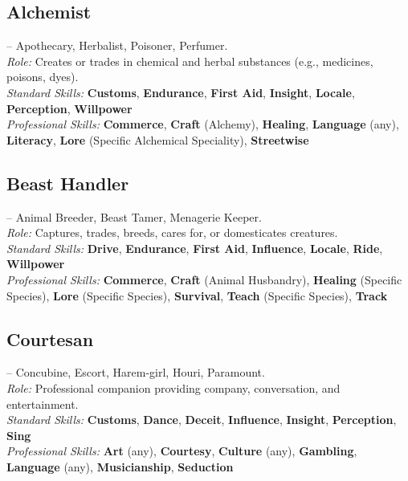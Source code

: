 \documentclass[10pt]{article}
\newcommand{\skill}[1]{\textbf{#1}}
\begin{document}
\subsection*{Alchemist}
\label{career:alchemist}
 -- Apothecary, Herbalist, Poisoner, Perfumer.\\
\textit{Role:} Creates or trades in chemical and herbal substances (e.g., medicines, poisons, dyes).\\
\textit{Standard Skills:} \skill{Customs}, \skill{Endurance}, \skill{First Aid}, \skill{Insight}, \skill{Locale}, \skill{Perception}, \skill{Willpower}\\
\textit{Professional Skills:} \skill{Commerce}, \skill{Craft} (Alchemy), \skill{Healing}, \skill{Language} (any), \skill{Literacy}, \skill{Lore} (Specific Alchemical Speciality), \skill{Streetwise}

\vspace{0.2cm}
\subsection*{Beast Handler}
\label{career:beasthandler}
 -- Animal Breeder, Beast Tamer, Menagerie Keeper.\\
\textit{Role:} Captures, trades, breeds, cares for, or domesticates creatures.\\
\textit{Standard Skills:} \skill{Drive}, \skill{Endurance}, \skill{First Aid}, \skill{Influence}, \skill{Locale}, \skill{Ride}, \skill{Willpower}\\
\textit{Professional Skills:} \skill{Commerce}, \skill{Craft} (Animal Husbandry), \skill{Healing} (Specific Species), \skill{Lore} (Specific Species), \skill{Survival}, \skill{Teach} (Specific Species), \skill{Track}

\vspace{0.2cm}
\subsection*{Courtesan}
\label{career:courtesan}
 -- Concubine, Escort, Harem-girl, Houri, Paramount.\\
\textit{Role:} Professional companion providing company, conversation, and entertainment.\\
\textit{Standard Skills:} \skill{Customs}, \skill{Dance}, \skill{Deceit}, \skill{Influence}, \skill{Insight}, \skill{Perception}, \skill{Sing}\\
\textit{Professional Skills:} \skill{Art} (any), \skill{Courtesy}, \skill{Culture} (any), \skill{Gambling}, \skill{Language} (any), \skill{Musicianship}, \skill{Seduction}
\end{document}

